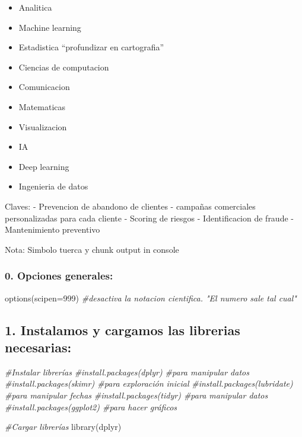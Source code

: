 \documentclass[
]{article}
\newenvironment{Shaded}{\begin{snugshade}}{\end{snugshade}}
\newcommand{\AttributeTok}[1]{\textcolor[rgb]{0.77,0.63,0.00}{#1}}
\newcommand{\CommentTok}[1]{\textcolor[rgb]{0.56,0.35,0.01}{\textit{#1}}}
\newcommand{\DecValTok}[1]{\textcolor[rgb]{0.00,0.00,0.81}{#1}}
\newcommand{\FunctionTok}[1]{\textcolor[rgb]{0.00,0.00,0.00}{#1}}
\newcommand{\NormalTok}[1]{#1}
\providecommand{\tightlist}{%
  \setlength{\itemsep}{0pt}\setlength{\parskip}{0pt}}
\begin{document}
\begin{itemize}
\tightlist
\item
  Analitica
\item
  Machine learning
\item
  Estadistica ``profundizar en cartografia''
\item
  Ciencias de computacion
\item
  Comunicacion
\item
  Matematicas
\item
  Visualizacion
\item
  IA
\item
  Deep learning
\item
  Ingenieria de datos
\end{itemize}

Claves: - Prevencion de abandono de clientes - campañas comerciales
personalizadas para cada cliente - Scoring de riesgos - Identificacion
de fraude - Mantenimiento preventivo

Nota: Simbolo tuerca y chunk output in console

\hypertarget{opciones-generales}{%
\subsubsection{0. Opciones generales:}\label{opciones-generales}}

\begin{Shaded}
\begin{Highlighting}[]
\FunctionTok{options}\NormalTok{(}\AttributeTok{scipen=}\DecValTok{999}\NormalTok{) }\CommentTok{\#desactiva la notacion cientifica. "El numero sale tal cual"}
\end{Highlighting}
\end{Shaded}

\hypertarget{instalamos-y-cargamos-las-librerias-necesarias}{%
\subsection{1. Instalamos y cargamos las librerias
necesarias:}\label{instalamos-y-cargamos-las-librerias-necesarias}}

\begin{Shaded}
\begin{Highlighting}[]
\CommentTok{\#Instalar librerías}
\CommentTok{\#install.packages(\textquotesingle{}dplyr\textquotesingle{}) \#para manipular datos}
\CommentTok{\#install.packages(\textquotesingle{}skimr\textquotesingle{}) \#para exploración inicial}
\CommentTok{\#install.packages(\textquotesingle{}lubridate\textquotesingle{}) \#para manipular fechas}
\CommentTok{\#install.packages(\textquotesingle{}tidyr\textquotesingle{}) \#para manipular datos}
\CommentTok{\#install.packages(\textquotesingle{}ggplot2\textquotesingle{}) \#para hacer gráficos}

\CommentTok{\#Cargar librerías}
\FunctionTok{library}\NormalTok{(dplyr)}
\end{Highlighting}
\end{Shaded}
\end{document}
